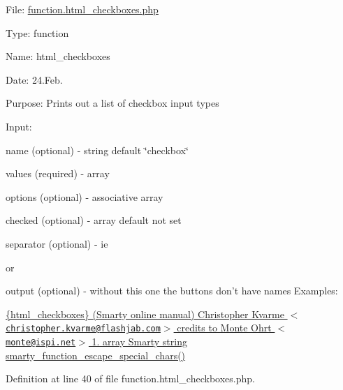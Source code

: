 \-File\-: \hyperlink{function_8html__checkboxes_8php}{function.\-html\-\_\-checkboxes.\-php}\par
 \-Type\-: function\par
 \-Name\-: html\-\_\-checkboxes\par
 \-Date\-: 24.\-Feb.\par
 \-Purpose\-: \-Prints out a list of checkbox input types\par
 \-Input\-:\par

\begin{DoxyItemize}
\item name (optional) -\/ string default \char`\"{}checkbox\char`\"{}
\item values (required) -\/ array
\item options (optional) -\/ associative array
\item checked (optional) -\/ array default not set
\item separator (optional) -\/ ie \par
 or ~
\item output (optional) -\/ without this one the buttons don't have names \-Examples\-: 
 \hyperlink{}{\{html\-\_\-checkboxes\} (\-Smarty online manual)  \-Christopher \-Kvarme $<$\href{mailto:christopher.kvarme@flashjab.com}{\tt christopher.\-kvarme@flashjab.\-com}$>$  credits to \-Monte \-Ohrt $<$\href{mailto:monte@ispi.net}{\tt monte@ispi.\-net}$>$  1.  array  \-Smarty  string  smarty\-\_\-function\-\_\-escape\-\_\-special\-\_\-chars() }
\end{DoxyItemize}

\-Definition at line 40 of file function.\-html\-\_\-checkboxes.\-php.


